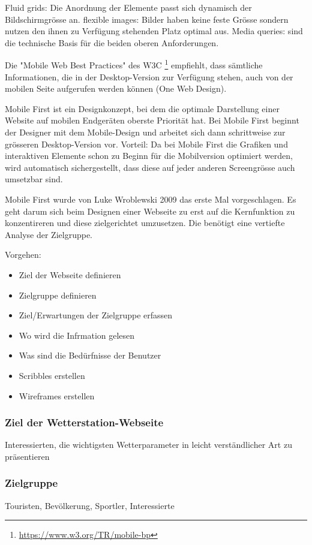Fluid grids: Die Anordnung der Elemente passt sich dynamisch der Bildschirmgrösse an.
flexible images: Bilder haben keine feste Grösse sondern nutzen den ihnen zu Verfügung stehenden Platz optimal aus.
Media queries: sind die technische Basis für die beiden oberen Anforderungen. 

Die "Mobile Web Best Practices" des W3C \footnote{ \url{https://www.w3.org/TR/mobile-bp}} empfiehlt, dass sämtliche Informationen, die in der Desktop-Version zur Verfügung stehen, auch von der mobilen Seite aufgerufen werden können (One Web Design).

Mobile First ist ein Designkonzept, bei dem die optimale Darstellung einer Website auf mobilen Endgeräten oberste Priorität hat. Bei Mobile First beginnt der Designer mit dem Mobile-Design und arbeitet sich dann schrittweise zur grösseren Desktop-Version vor. Vorteil: Da bei Mobile First die Grafiken und interaktiven Elemente schon zu Beginn für die Mobilversion optimiert werden, wird automatisch sichergestellt, dass diese auf jeder anderen Screengrösse auch umsetzbar sind.

Mobile First wurde von Luke Wroblewski 2009 das erste Mal vorgeschlagen. Es geht darum sich beim Designen einer Webseite zu erst auf die Kernfunktion zu konzentireren und diese zielgerichtet umzusetzen. Die benötigt eine vertiefte Analyse der Zielgruppe.

Vorgehen:

\begin{itemize}  
\item Ziel der Webseite definieren
\item Zielgruppe definieren
\item Ziel/Erwartungen der Zielgruppe erfassen
\item Wo wird die Infrmation gelesen
\item Was sind die Bedürfnisse der Benutzer
\item Scribbles erstellen
\item Wireframes erstellen
\end{itemize}

\subsubsection*{Ziel der Wetterstation-Webseite}
Interessierten, die wichtigsten Wetterparameter in leicht verständlicher Art zu präsentieren
\subsubsection*{Zielgruppe}
Touristen, Bevölkerung, Sportler, Interessierte
